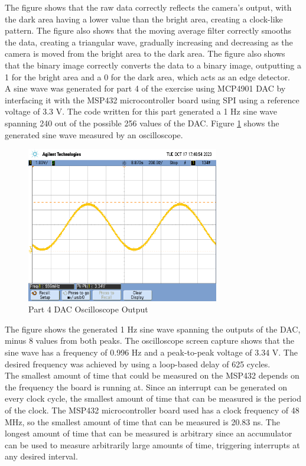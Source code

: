 \documentclass[CMPE]{KGCOEReport}
\begin{document}
The figure shows that the raw data correctly reflects the camera's output, with the dark area having a lower value than the bright area, creating a clock-like pattern. The figure also shows that the moving average filter correctly smooths the data, creating a triangular wave, gradually increasing and decreasing as the camera is moved from the bright area to the dark area. The figure also shows that the binary image correctly converts the data to a binary image, outputting a 1 for the bright area and a 0 for the dark area, which acts as an edge detector.\\

A sine wave was generated for part 4 of the exercise using MCP4901 DAC by interfacing it with the MSP432 microcontroller board using SPI using a reference voltage of 3.3 V. The code written for this part generated a 1 Hz sine wave spanning 240 out of the possible 256 values of the DAC. Figure \ref{fig:part4} shows the generated sine wave measured by an oscilloscope.

\begin{figure}[H]
    \centering
    \includegraphics[width=0.75\textwidth]{part4.png}
    \caption{Part 4 DAC Oscilloscope Output}
    \label{fig:part4}
\end{figure}

The figure shows the generated 1 Hz sine wave spanning the outputs of the DAC, minus 8 values from both peaks. The oscilloscope screen capture shows that the sine wave has a frequency of 0.996 Hz and a peak-to-peak voltage of 3.34 V. The desired frequency was achieved by using a loop-based delay of 625 cycles.\\

The smallest amount of time that could be measured on the MSP432 depends on the frequency the board is running at. Since an interrupt can be generated on every clock cycle, the smallest amount of time that can be measured is the period of the clock. The MSP432 microcontroller board used has a clock frequency of 48 MHz, so the smallest amount of time that can be measured is 20.83 ns. The longest amount of time that can be measured is arbitrary since an accumulator can be used to measure arbitrarily large amounts of time, triggering interrupts at any desired interval.\\
\end{document}
